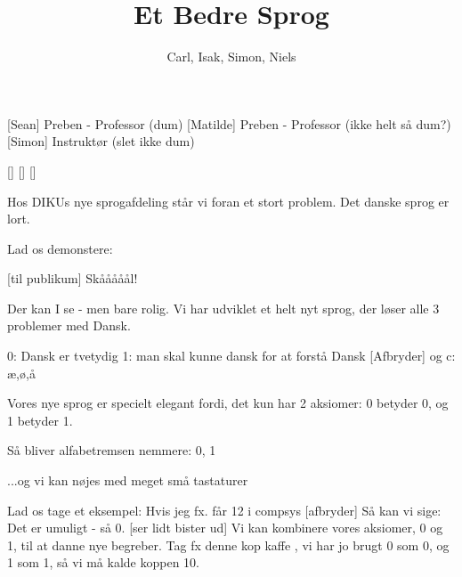 \documentclass[a4paper,11pt]{article}
\title{Et Bedre Sprog}
\author{Carl, Isak, Simon, Niels}
\begin{document}
\maketitle

\begin{roles}
  [Sean] Preben - Professor (dum)
  [Matilde] Preben - Professor (ikke helt så dum?)
  [Simon] Instruktør (slet ikke dum)
\end{roles}

\begin{props}
  []
  []
  []
\end{props}

\begin{sketch}



 Hos DIKUs nye sprogafdeling står vi foran et stort problem. Det danske sprog er lort.

 Lad os demonstere:

[til publikum] Skååååål!



 Der kan I se - men bare rolig. Vi har udviklet et helt nyt sprog, der løser alle 3 problemer med Dansk.

 0: Dansk er tvetydig
 1: man skal kunne dansk for at forstå Dansk
[Afbryder] og c: æ,ø,å

 Vores nye sprog er specielt elegant fordi, det kun har 2 aksiomer:
 0 betyder 0,
 og 1 betyder 1.

 Så bliver alfabetremsen nemmere:  0, 1

 ...og vi kan nøjes med meget små tastaturer

 Lad os tage et eksempel: Hvis jeg fx. får 12 i compsys
[afbryder] Så kan vi sige: Det er umuligt - så 0.
[ser lidt bister ud] Vi kan kombinere vores aksiomer, 0 og 1, til at danne nye begreber.
 Tag fx denne kop kaffe , vi har jo brugt 0 som 0, og 1 som 1, så vi må kalde koppen 10.


\end{sketch}
\end{document}
